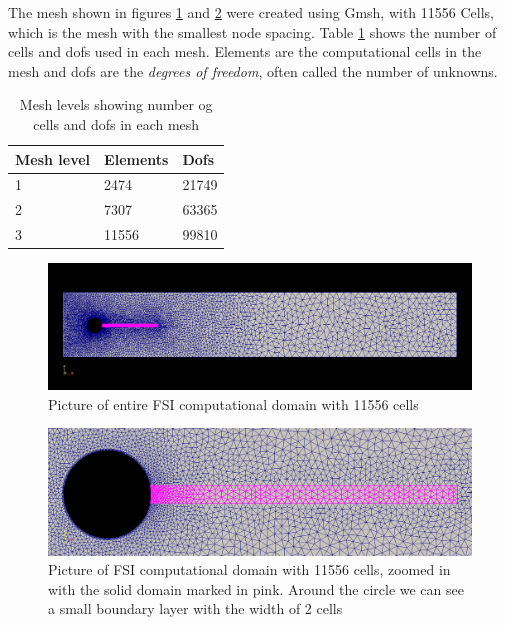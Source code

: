 The mesh shown in figures \ref{fig:fullmesh} and \ref{fig:partmesh} were created using Gmsh, with 11556 Cells, which is the mesh with the smallest node spacing. Table \ref{meshes} shows the number of cells and dofs used in each mesh. Elements are the computational cells in the mesh and dofs are the \textit{degrees of freedom}, often called the number of unknowns.

\begin{table}[H]
\centering
\label{meshes}
\begin{tabular}{|l|l|l|}
\hline
Mesh level & Elements & Dofs \\ \hline
1 & 2474 & 21749 \\ \hline
2 & 7307 & 63365 \\ \hline
3 & 11556 & 99810 \\ \hline
\end{tabular}
\caption{Mesh levels showing number og cells and dofs in each mesh}
\end{table}

\begin{figure}[H]
\centering
\includegraphics[scale=0.35,trim={20mm 34mm 20mm 30mm},clip]{./Verification_Validation/Hron_Turek/FSI_domain_b2.png}
\caption{Picture of entire FSI computational domain with 11556 cells}
\label{fig:fullmesh}
\end{figure}
\begin{figure}[H]
\centering
\includegraphics[scale=0.32,trim={0mm 0mm 0mm 0mm},clip]{./Verification_Validation/Hron_Turek/FSI_domain_b2_zoom.png}
\caption{Picture of FSI computational domain with 11556 cells, zoomed in with the solid domain marked in pink. Around the circle we can see a small boundary layer with the width of 2 cells}
\label{fig:partmesh}
\end{figure}



